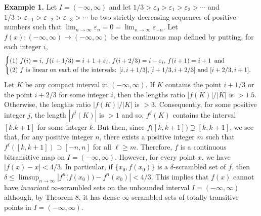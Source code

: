\documentclass[12pt]{article}
\newcommand{\va}{\varepsilon}
\begin{document}
\noindent
{\bf Example 1.} Let $I = (-\infty, \infty)$ and let $1/3 > \va_0 > \va_1 > \va_2 > \cdots$ and $1/3 > \va_{-1} > \va_{-2} > \va_{-3} > \cdots$ be two strictly decreasing sequences of positive numbers such that $\lim_{n \to \infty} \va_n = 0 = \lim_{n \to \infty} \va_{-n}$.  Let $f(x) : (-\infty, \infty) \rightarrow (-\infty, \infty)$ be the continuous map defined by putting, for each integer $i$, 
$$
\begin{cases}
(1) \,\, f(i) = i, \, f(i + 1/3) = i+1 + \va_i, \, f(i + 2/3) = i - \va_i, \, f(i+1) = i+1 \,\,\, \text{and} \cr
(2) \,\, \text{$f$ is linear on each of the intervals: $[i, i+1/3], [i+1/3, i+2/3]$ and $[i+2/3, i+1]$}.\cr
\end{cases}
$$
\indent Let $K$ be any compact interval in $(-\infty, \infty)$.  If $K$ contains the point $i+1/3$ or the point $i+2/3$ for some integer $i$, then the lengths ratio $|f(K)|/|K|$ is $> 1.5$.  Otherwise, the lengths ratio $|f(K)|/|K|$ is $> 3$.  Consequently, for some positive integer $j$, the length $|f^j(K)|$ is $> 1$ and so, $f^j(K)$ contains the interval $[k. k+1]$ for some integer $k$.  But then, since $f\big([k, k+1]\big) \supsetneq [k, k+1]$, we see that, for any positive integer $n$, there exists a positive integer $m$ such that $f^\ell([k, k+1]) \supset [-n, n]$ for all $\ell \ge m$.  Therefore, $f$ is a continuous bitransitive map on $I = (-\infty, \infty)$.  However, for every point $x$, we have $|f(x) - x| < 4/3$.  In particular, if $\{ x_0, f(x_0) \}$ is a $\delta$-scrambled set of $f$, then $\delta \le \limsup_{n \to \infty} |f^n\big(f(x_0)\big)-f^n(x_0)| < 4/3$.  This implies that $f(x)$ cannot have {\it invariant} $\infty$-scrambled sets on the unbounded interval $I = (-\infty, \infty)$ although, by Theorem 8, it has dense $\infty$-scrambled sets of totally transitive points in $I = (-\infty, \infty)$.  
\end{document}
